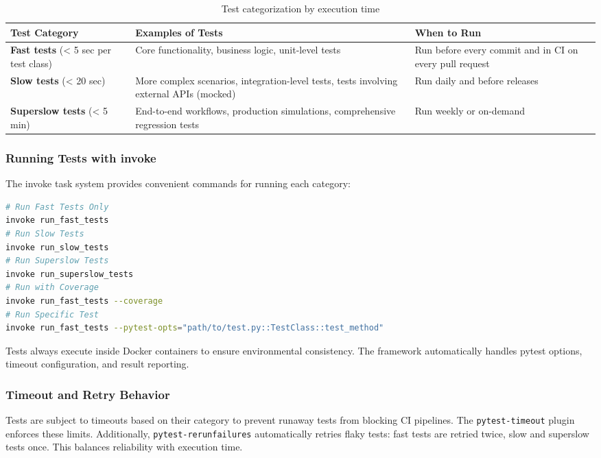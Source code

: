 \begin{table}[h]
\centering
\begin{tabular}{|l|p{5cm}|p{5cm}|}
\hline
\textbf{Test Category} & \textbf{Examples of Tests} & \textbf{When to Run} \\
\hline
\textbf{Fast tests} (< 5 sec per test class) & Core functionality, business logic, unit-level tests & Run before every commit and in CI on every pull request \\
\hline
\textbf{Slow tests} (< 20 sec) & More complex scenarios, integration-level tests, tests involving external APIs (mocked) & Run daily and before releases \\
\hline
\textbf{Superslow tests} (< 5 min) & End-to-end workflows, production simulations, comprehensive regression tests & Run weekly or on-demand \\
\hline
\end{tabular}
\caption{Test categorization by execution time}
\label{tab:test_categories}
\end{table}

\subsubsection{Running Tests with invoke}
The invoke task system provides convenient commands for running each
category:

\begin{lstlisting}[language=bash]
# Run Fast Tests Only
invoke run_fast_tests
# Run Slow Tests
invoke run_slow_tests
# Run Superslow Tests
invoke run_superslow_tests
# Run with Coverage
invoke run_fast_tests --coverage
# Run Specific Test
invoke run_fast_tests --pytest-opts="path/to/test.py::TestClass::test_method"
\end{lstlisting}
Tests always execute inside Docker containers to ensure environmental consistency.
The framework automatically handles pytest options, timeout configuration,
and result reporting.

\subsubsection{Timeout and Retry Behavior}
Tests are subject to timeouts based on their category to prevent runaway
tests from blocking CI pipelines. The \texttt{pytest-timeout} plugin enforces
these limits. Additionally, \texttt{pytest-rerunfailures} automatically
retries flaky tests: fast tests are retried twice, slow and superslow
tests once. This balances reliability with execution time.

